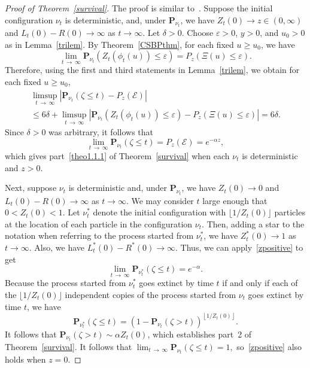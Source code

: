 \documentclass[10pt]{amsart}
\theoremstyle{definition}\newtheorem{defi}[theo]{Definition}\newtheorem{rema}[theo]{Remark}\newtheorem{exam}[theo]{Example}\newtheorem{exem}[theo]{Example}\newtheorem{nota}[theo]{Notation}
\newcommand*\eps{\varepsilon}
\renewcommand*\P{\mathbf{P}}
\newcommand{\clE}{\mathcal{E}}
\newcommand{\1} {\mathds{1}}
\begin{document}
\begin{proof}[Proof of Theorem~\ref{survival}]
The proof is similar to~\cite[the proof of Proposition~6]{bbs4}. Suppose the initial configuration $\nu_t$ is deterministic, and, under $\P_{\nu_t}$, we have $Z_t(0) \rightarrow z \in (0, \infty)$ and $L_t(0) - R(0) \rightarrow \infty$ as $t \rightarrow \infty$. Let $\delta > 0$. Choose $\eps > 0$, $y > 0$, and $u_0 > 0$ as in Lemma~\ref{trilem}. By Theorem~\ref{CSBPthm}, for each fixed $u \geq u_0$, we have
\[
\lim_{t\,\rightarrow\,\infty} \P_{\nu_t}(Z_t(\phi_t(u)) \leq \eps) = P_z(\Xi(u) \leq \eps).
\]
Therefore, using the first and third statements in Lemma~\ref{trilem}, we obtain for each fixed $u \geq u_0$,
\begin{multline*}
\limsup_{t\,\rightarrow\,\infty} \left|\P_{\nu_t}(\zeta \leq t) - P_z(\clE)\right|\\
\leq 6 \delta + \limsup_{t\,\rightarrow\,\infty} \left|\P_{\nu_t}\left(Z_t(\phi_t(u)) \leq \eps\right) - P_z(\Xi(u) \leq \eps)\right| = 6 \delta.
\end{multline*}
Since $\delta > 0$ was arbitrary, it follows that
\begin{equation}\label{zpositive}
\lim_{t\,\rightarrow\,\infty} \P_{\nu_t}(\zeta \leq t) = P_z(\clE) = e^{-\alpha z},
\end{equation}
which gives part~\eqref{theo1.1.1} of Theorem~\ref{survival} when each $\nu_t$ is deterministic and $z > 0$.

Next, suppose $\nu_t$ is deterministic and, under $\P_{\nu_t}$, we have $Z_t(0) \rightarrow 0$ and $L_t(0) - R(0) \rightarrow \infty$ as $t \rightarrow \infty$. We may consider $t$ large enough that $0 < Z_t(0) < 1$. Let $\nu_t^*$ denote the initial configuration with $\lfloor 1/Z_t(0) \rfloor$ particles at the location of each particle in the configuration $\nu_t$. Then, adding a star to the notation when referring to the process started from $\nu_t^*$, we have $Z_t^*(0) \rightarrow 1$ as $t \rightarrow \infty$. Also, we have $L_t^*(0) - R^*(0) \rightarrow \infty$. Thus, we can apply~\eqref{zpositive} to get
\[
\lim_{t\,\rightarrow\,\infty} \P_{\nu_t^*}(\zeta \leq t) = e^{-\alpha}.
\]
Because the process started from $\nu_t^*$ goes extinct by time $t$ if and only if each of the $\lfloor 1/Z_t(0) \rfloor$ independent copies of the process started from $\nu_t$ goes extinct by time $t$, we have
\[
\P_{\nu_t^*}(\zeta \leq t) = \left(1 - \P_{\nu_t}(\zeta > t)\right)^{\left\lfloor 1/Z_t(0) \right\rfloor}.
\]
It follows that $\P_{\nu_t}(\zeta > t) \sim \alpha Z_t(0)$, which establishes part~2 of Theorem~\ref{survival}. It follows that $\lim_{t\,\rightarrow\,\infty} \P_{\nu_t}(\zeta \leq t) = 1,$ so~\eqref{zpositive} also holds when $z = 0$.


\end{proof}
\end{document}
